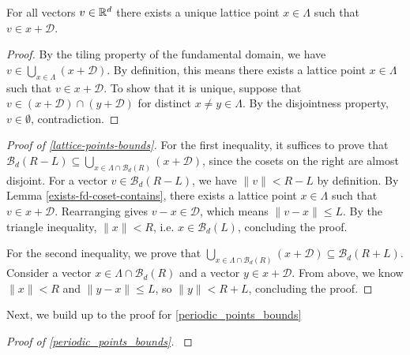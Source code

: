 \begin{lemma}\label{exists-fd-coset-contains}\lean{}
  For all vectors $v \in \mathbb{R}^d$ there exists a unique lattice point $x \in \Lambda$ such that $v \in x + \mathcal{D}$.
\end{lemma}
\begin{proof}
  By the tiling property of the fundamental domain, we have $v \in \bigcup_{x \in \Lambda} (x + \mathcal{D})$. By definition, this means there exists a lattice point $x \in \Lambda$ such that $v \in x + \mathcal{D}$. To show that it is unique, suppose that $v \in (x + \mathcal{D}) \cap (y + \mathcal{D})$ for distinct $x \neq y \in \Lambda$. By the disjointness property, $v \in \emptyset$, contradiction.
\end{proof}

\begin{proof}[Proof of \cref{lattice-points-bounds}]\label{lattice-points-bounds-proof}
  For the first inequality, it suffices to prove that $\mathcal{B}_d(R - L) \subseteq \bigcup_{x \in \Lambda \cap \mathcal{B}_d(R)} (x + \mathcal{D})$, since the cosets on the right are almost disjoint. For a vector $v \in \mathcal{B}_d(R - L)$, we have $\|v\| < R - L$ by definition. By Lemma \cref{exists-fd-coset-contains}, there exists a lattice point $x \in \Lambda$ such that $v \in x + \mathcal{D}$. Rearranging gives $v - x \in \mathcal{D}$, which means $\|v - x\| \leq L$. By the triangle inequality, $\|x\| < R$, i.e. $x \in \mathcal{B}_d(L)$, concluding the proof.

  For the second inequality, we prove that $\bigcup_{x \in \Lambda \cap \mathcal{B}_d(R)} (x + \mathcal{D}) \subseteq \mathcal{B}_d(R + L)$. Consider a vector $x \in \Lambda \cap \mathcal{B}_d(R)$ and a vector $y \in x + \mathcal{D}$. From above, we know $\|x\| < R$ and $\|y - x\| \leq L$, so $\|y\| < R + L$, concluding the proof.
\end{proof}

Next, we build up to the proof for \cref{periodic_points_bounds}

\begin{definition}\label{periodic_quot_lattice_def}
\end{definition}

\begin{proof}[Proof of \cref{periodic_points_bounds}]\label{periodic_points_bounds_proof}\leanok
\end{proof}
